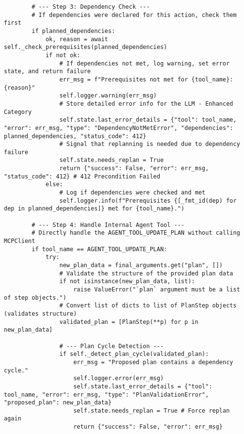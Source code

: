 \documentclass[12pt,a4paper]{article}
\begin{document}
\begin{pageablecode}
\begin{verbatim}
        # --- Step 3: Dependency Check ---
        # If dependencies were declared for this action, check them first
        if planned_dependencies:
            ok, reason = await self._check_prerequisites(planned_dependencies)
            if not ok:
                # If dependencies not met, log warning, set error state, and return failure
                err_msg = f"Prerequisites not met for {tool_name}: {reason}"
                self.logger.warning(err_msg)
                # Store detailed error info for the LLM - Enhanced Category
                self.state.last_error_details = {"tool": tool_name, "error": err_msg, "type": "DependencyNotMetError", "dependencies": planned_dependencies, "status_code": 412}
                # Signal that replanning is needed due to dependency failure
                self.state.needs_replan = True
                return {"success": False, "error": err_msg, "status_code": 412} # 412 Precondition Failed
            else:
                # Log if dependencies were checked and met
                self.logger.info(f"Prerequisites {[_fmt_id(dep) for dep in planned_dependencies]} met for {tool_name}.")

        # --- Step 4: Handle Internal Agent Tool ---
        # Directly handle the AGENT_TOOL_UPDATE_PLAN without calling MCPClient
        if tool_name == AGENT_TOOL_UPDATE_PLAN:
            try:
                new_plan_data = final_arguments.get("plan", [])
                # Validate the structure of the provided plan data
                if not isinstance(new_plan_data, list):
                    raise ValueError("`plan` argument must be a list of step objects.")
                # Convert list of dicts to list of PlanStep objects (validates structure)
                validated_plan = [PlanStep(**p) for p in new_plan_data]

                # --- Plan Cycle Detection ---
                if self._detect_plan_cycle(validated_plan):
                    err_msg = "Proposed plan contains a dependency cycle."
                    self.logger.error(err_msg)
                    self.state.last_error_details = {"tool": tool_name, "error": err_msg, "type": "PlanValidationError", "proposed_plan": new_plan_data}
                    self.state.needs_replan = True # Force replan again
                    return {"success": False, "error": err_msg}


\end{verbatim}
\end{pageablecode}
\end{document}
